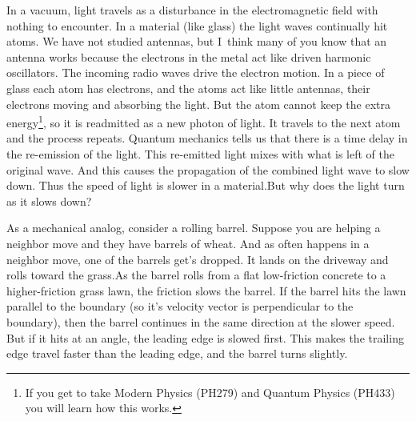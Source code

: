 \documentclass{article}
\begin{document}
In a vacuum, light travels as a disturbance in the electromagnetic field
with nothing to encounter. In a material (like glass) the light waves
continually hit atoms. We have not studied antennas, but I\ think many of
you know that an antenna works because the electrons in the metal act like
driven harmonic oscillators. The incoming radio waves drive the electron
motion. In a piece of glass each atom has electrons, and the atoms act like
little antennas, their electrons moving and absorbing the light. But the
atom cannot keep the extra energy\footnote{%
If you get to take Modern Physics (PH279) and Quantum Physics (PH433) you
will learn how this works.}, so it is readmitted as a new photon of light.
It travels to the next atom and the process repeats. Quantum mechanics tells
us that there is a time delay in the re-emission of the light. This
re-emitted light mixes with what is left of the original wave. And this
causes the propagation of the combined light wave to slow down. Thus the
speed of light is slower in a material.But why does the light turn as it
slows down?

As a mechanical analog, consider a rolling barrel. Suppose you are helping a
neighbor move and they have barrels of wheat. And as often happens in a
neighbor move, one of the barrels get's dropped. It lands on the driveway
and rolls toward the grass.As the barrel rolls from a flat
low-friction concrete to a higher-friction grass lawn, the friction slows
the barrel. If the barrel hits the lawn parallel to the boundary (so it's
velocity vector is perpendicular to the boundary), then the barrel continues
in the same direction at the slower speed. But if it hits at an angle, the
leading edge is slowed first. This makes the trailing edge
travel faster than the leading edge, and the barrel turns slightly.
\end{document}
